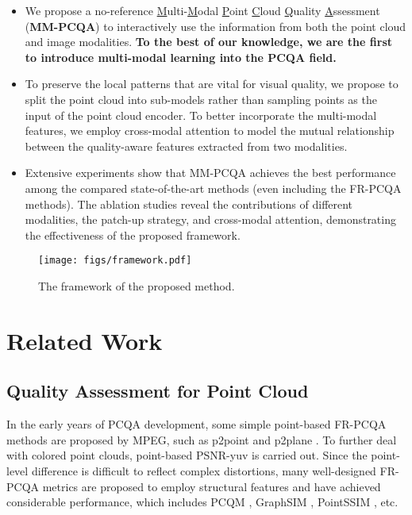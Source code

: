 \documentclass{article}
\begin{document}
\begin{itemize}
    \item We propose a no-reference \underline{M}ulti-\underline{M}odal \underline{P}oint \underline{C}loud \underline{Q}uality \underline{A}ssessment (\textbf{MM-PCQA}) to interactively use the information from both the point cloud and image modalities. \textbf{To the best of our knowledge, we are the first to introduce multi-modal learning into the PCQA field.}
    \item To preserve the local patterns that are vital for visual quality, we propose to split the point cloud into sub-models rather than sampling points as the input of the point cloud encoder. To better incorporate the multi-modal features, we employ cross-modal attention to model the mutual relationship between the quality-aware features extracted from two modalities.
    \item Extensive experiments show that MM-PCQA achieves the best performance among the compared state-of-the-art methods (even including the FR-PCQA methods). The ablation studies reveal the contributions of different modalities, the patch-up strategy, and cross-modal attention, demonstrating the effectiveness of the proposed framework.
\end{itemize}






\begin{figure*}
    \centering
    \texttt{[image: figs/framework.pdf]}
    \caption{The framework of the proposed method.}
    \label{fig:framework}
\end{figure*}





\section{Related Work}
\subsection{Quality Assessment for Point Cloud}
In the early years of PCQA development, some simple point-based FR-PCQA methods are proposed by MPEG, such as p2point \cite{mekuria2016evaluation} and p2plane \cite{tian2017geometric}. To further deal with colored point clouds, point-based PSNR-yuv \cite{torlig2018novel} is carried out. Since the point-level difference is difficult to reflect complex distortions, many well-designed FR-PCQA metrics are proposed to employ structural features and have achieved considerable performance, which includes PCQM \cite{meynet2020pcqm}, GraphSIM \cite{yang2020graphsim}, PointSSIM \cite{alexiou2020pointssim}, etc. 
\end{document}
